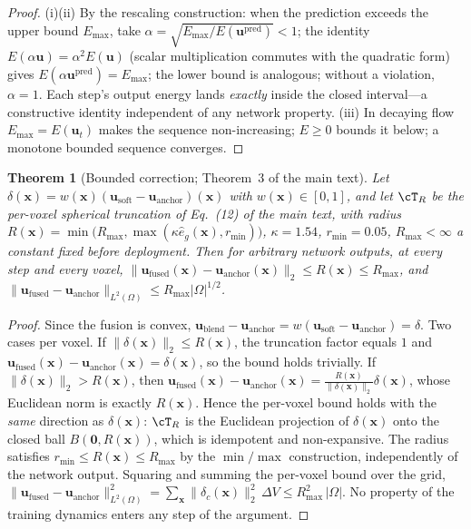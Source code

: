 \documentclass[11pt,a4paper]{article}
\newtheorem{theorem}{Theorem}
\newcommand{\bu}{\bm{u}}
\newcommand{\Ex}{E}
\begin{document}
\begin{proof}
(i)(ii) By the rescaling construction: when the prediction exceeds the upper bound $\Ex_{\max}$, take $\alpha=\sqrt{\Ex_{\max}/\Ex(\bu^{\mathrm{pred}})}<1$; the identity $\Ex(\alpha\bu)=\alpha^2\Ex(\bu)$ (scalar multiplication commutes with the quadratic form) gives $\Ex(\alpha\bu^{\mathrm{pred}})=\Ex_{\max}$; the lower bound is analogous; without a violation, $\alpha=1$. Each step's output energy lands \emph{exactly} inside the closed interval---a constructive identity independent of any network property. (iii) In decaying flow $\Ex_{\max}=\Ex(\bu_t)$ makes the sequence non-increasing; $\Ex\ge0$ bounds it below; a monotone bounded sequence converges.
\end{proof}

\begin{theorem}[Bounded correction; Theorem~3 of the main text]
Let $\delta(\bm{x})=w(\bm{x})(\bu_{\mathrm{soft}}-\bu_{\mathrm{anchor}})(\bm{x})$ with $w(\bm{x})\in[0,1]$, and let $\cT_R$ be the per-voxel spherical truncation of Eq.~(12) of the main text, with radius $R(\bm{x})=\min\!\big(R_{\max},\max(\kappa\hat e_g(\bm{x}),r_{\min})\big)$, $\kappa=1.54$, $r_{\min}=0.05$, $R_{\max}<\infty$ a constant fixed before deployment. Then for arbitrary network outputs, at every step and every voxel,
$\|\bu_{\mathrm{fused}}(\bm{x})-\bu_{\mathrm{anchor}}(\bm{x})\|_2\le R(\bm{x})\le R_{\max}$, and
$\|\bu_{\mathrm{fused}}-\bu_{\mathrm{anchor}}\|_{L^2(\Omega)}\le R_{\max}|\Omega|^{1/2}$.
\end{theorem}

\begin{proof}
Since the fusion is convex, $\bu_{\mathrm{blend}}-\bu_{\mathrm{anchor}}=w(\bu_{\mathrm{soft}}-\bu_{\mathrm{anchor}})=\delta$. Two cases per voxel. If $\|\delta(\bm{x})\|_2\le R(\bm{x})$, the truncation factor equals $1$ and $\bu_{\mathrm{fused}}(\bm{x})-\bu_{\mathrm{anchor}}(\bm{x})=\delta(\bm{x})$, so the bound holds trivially. If $\|\delta(\bm{x})\|_2>R(\bm{x})$, then
$\bu_{\mathrm{fused}}(\bm{x})-\bu_{\mathrm{anchor}}(\bm{x})=\frac{R(\bm{x})}{\|\delta(\bm{x})\|_2}\delta(\bm{x})$,
whose Euclidean norm is exactly $R(\bm{x})$. Hence the per-voxel bound holds with the \emph{same} direction as $\delta(\bm{x})$: $\cT_R$ is the Euclidean projection of $\delta(\bm{x})$ onto the closed ball $B(\bm 0,R(\bm{x}))$, which is idempotent and non-expansive. The radius satisfies $r_{\min}\le R(\bm{x})\le R_{\max}$ by the $\min/\max$ construction, independently of the network output. Squaring and summing the per-voxel bound over the grid,
$\|\bu_{\mathrm{fused}}-\bu_{\mathrm{anchor}}\|_{L^2(\Omega)}^2=\sum_{\bm{x}}\|\delta_c(\bm{x})\|_2^2\,\Delta V\le R_{\max}^2\,|\Omega|$.
No property of the training dynamics enters any step of the argument.
\end{proof}
\end{document}
